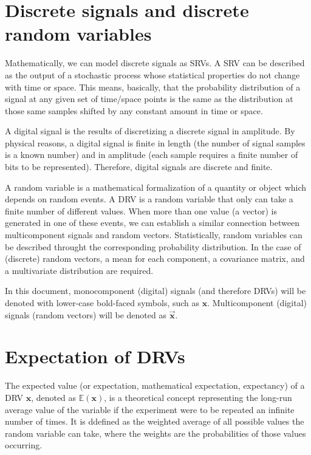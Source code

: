 \section{Discrete signals and discrete random variables}
\label{sec:DSRV}

Mathematically, we can model discrete signals as \glspl{SRV}. A
\gls{SRV} can be described as the output of a stochastic process whose
statistical properties do not change with time or space. This means,
basically, that the probability distribution of a signal at any given
set of time/space points is the same as the distribution at those same
samples shifted by any constant amount in time or space.

A digital signal is the results of discretizing a discrete signal in
amplitude. By physical reasons, a digital signal is finite in length
(the number of signal samples is a known number) and in amplitude
(each sample requires a finite number of bits to be
represented). Therefore, digital signals are discrete and finite.

A random variable is a mathematical formalization of a quantity or
object which depends on random events. A \gls{DRV} is a random
variable that only can take a finite number of different values. When
more than one value (a vector) is generated in one of these events, we
can establish a similar connection between multicomponent signals and
random vectors. Statistically, random variables can be described
throught the corresponding probability
distribution. In the case of (discrete) random vectors, a mean for each
component, a covariance matrix, and a multivariate distribution are
required.

In this document, monocomponent (digital) signals (and therefore
\glspl{DRV}) will be denoted with lower-case bold-faced symbols,
such as $\mathbf{x}$. Multicomponent (digital) signals (random
vectors) will be denoted as $\overrightarrow{\mathbf{x}}$.


\section{Expectation of \glspl{DRV}}
The expected value (or expectation, mathematical expectation,
expectancy) of a \gls{DRV} $\mathbf{x}$, denoted as
$\mathbb{E}(\mathbf{x})$, is a theoretical concept representing the
long-run average value of the variable if the experiment were to be
repeated an infinite number of times. It is ddefined as the weighted
average of all possible values the random variable can take, where the
weights are the probabilities of those values occurring.


